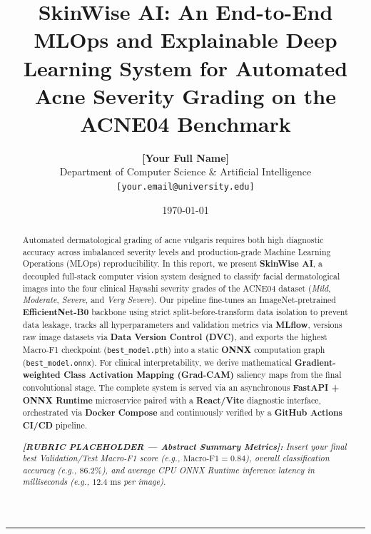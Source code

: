 \documentclass[11pt,a4paper]{article}
\title{
    \textbf{SkinWise AI: An End-to-End MLOps and Explainable Deep Learning System for Automated Acne Severity Grading on the ACNE04 Benchmark}
}
\author{
    \textbf{[Your Full Name]} \\
    Department of Computer Science \& Artificial Intelligence \\
    \texttt{[your.email@university.edu]}
}
\date{\today}
\begin{document}
\maketitle

\begin{abstract}
\noindent
Automated dermatological grading of acne vulgaris requires both high diagnostic accuracy across imbalanced severity levels and production-grade Machine Learning Operations (MLOps) reproducibility. In this report, we present \textbf{SkinWise AI}, a decoupled full-stack computer vision system designed to classify facial dermatological images into the four clinical Hayashi severity grades of the ACNE04 dataset (\textit{Mild}, \textit{Moderate}, \textit{Severe}, and \textit{Very Severe}). Our pipeline fine-tunes an ImageNet-pretrained \textbf{EfficientNet-B0} backbone using strict split-before-transform data isolation to prevent data leakage, tracks all hyperparameters and validation metrics via \textbf{MLflow}, versions raw image datasets via \textbf{Data Version Control (DVC)}, and exports the highest Macro-F1 checkpoint (\texttt{best\_model.pth}) into a static \textbf{ONNX} computation graph (\texttt{best\_model.onnx}). For clinical interpretability, we derive mathematical \textbf{Gradient-weighted Class Activation Mapping (Grad-CAM)} saliency maps from the final convolutional stage. The complete system is served via an asynchronous \textbf{FastAPI + ONNX Runtime} microservice paired with a \textbf{React/Vite} diagnostic interface, orchestrated via \textbf{Docker Compose} and continuously verified by a \textbf{GitHub Actions CI/CD} pipeline.

\medskip
\noindent
\textit{\textbf{[RUBRIC PLACEHOLDER --- Abstract Summary Metrics]:} Insert your final best Validation/Test Macro-F1 score (e.g., $\text{Macro-F1} = 0.84$), overall classification accuracy (e.g., $86.2\%$), and average CPU ONNX Runtime inference latency in milliseconds (e.g., $12.4\text{ ms}$ per image).}
\end{abstract}

\vspace{0.5em}
\hrule
\vspace{1em}

\end{document}
